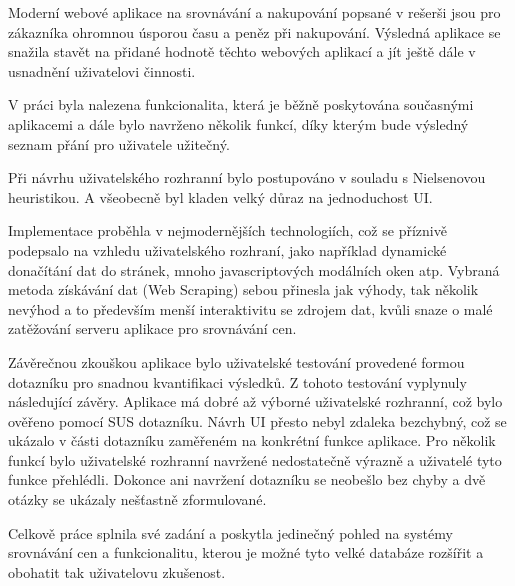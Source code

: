 \begin{conclusion}

Moderní webové aplikace na srovnávání a nakupování popsané v rešerši jsou pro zákazníka ohromnou úsporou času a peněz při nakupování. Výsledná aplikace se snažila stavět na přidané hodnotě těchto webových aplikací a jít ještě dále v usnadnění uživatelovi činnosti.

V práci byla nalezena funkcionalita, která je běžně poskytována současnými aplikacemi a dále bylo navrženo několik funkcí, díky kterým bude výsledný seznam přání pro uživatele užitečný.

Při návrhu uživatelského rozhranní bylo postupováno v souladu s Nielsenovou heuristikou\cite{molich1990improving}. A všeobecně byl kladen velký důraz na jednoduchost UI.

Implementace proběhla v nejmodernějších technologiích, což se příznivě podepsalo na vzhledu uživatelského rozhraní, jako například dynamické donačítání dat do stránek, mnoho javascriptových modálních oken atp. Vybraná metoda získávání dat (Web Scraping) sebou přinesla jak výhody, tak několik nevýhod a to především menší interaktivitu se zdrojem dat, kvůli snaze o malé zatěžování serveru aplikace pro srovnávání cen.

Závěrečnou zkouškou aplikace bylo uživatelské testování provedené formou dotazníku pro snadnou kvantifikaci výsledků. Z tohoto testování vyplynuly následující závěry. Aplikace má dobré až výborné uživatelské rozhranní, což bylo ověřeno pomocí SUS dotazníku. Návrh UI přesto nebyl zdaleka bezchybný, což se ukázalo v části dotazníku zaměřeném na konkrétní funkce aplikace. Pro několik funkcí bylo uživatelské rozhranní navržené nedostatečně výrazně a uživatelé tyto funkce přehlédli. Dokonce ani navržení dotazníku se neobešlo bez chyby a dvě otázky se ukázaly nešťastně zformulované.

Celkově práce splnila své zadání a poskytla jedinečný pohled na systémy srovnávání cen a funkcionalitu, kterou je možné tyto velké databáze rozšířit a obohatit tak uživatelovu zkušenost.


\end{conclusion}